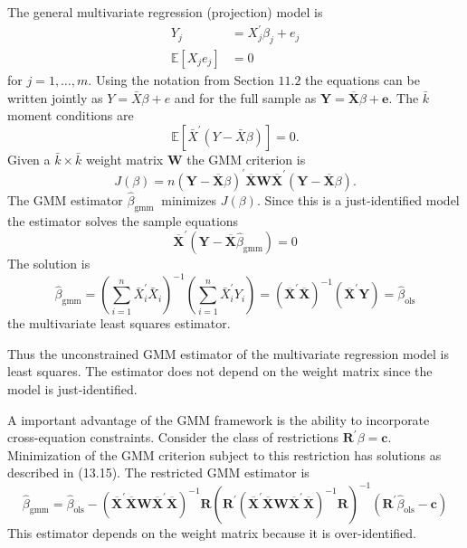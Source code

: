 \documentclass[10pt]{article}
\begin{document}
The general multivariate regression (projection) model is
$$
\begin{aligned}
Y_{j} &=X_{j}^{\prime} \beta_{j}+e_{j} \\
\mathbb{E}\left[X_{j} e_{j}\right] &=0
\end{aligned}
$$
for $j=1, \ldots, m$. Using the notation from Section $11.2$ the equations can be written jointly as $Y=\bar{X} \beta+e$ and for the full sample as $\boldsymbol{Y}=\overline{\boldsymbol{X}} \beta+\boldsymbol{e}$. The $\bar{k}$ moment conditions are
$$
\mathbb{E}\left[\bar{X}^{\prime}(Y-\bar{X} \beta)\right]=0 .
$$
Given a $\bar{k} \times \bar{k}$ weight matrix $\boldsymbol{W}$ the GMM criterion is
$$
J(\beta)=n(\boldsymbol{Y}-\overline{\boldsymbol{X}} \beta)^{\prime} \overline{\boldsymbol{X}} \boldsymbol{W} \overline{\boldsymbol{X}}^{\prime}(\boldsymbol{Y}-\overline{\boldsymbol{X}} \beta) .
$$
The GMM estimator $\widehat{\beta}_{\text {gmm }}$ minimizes $J(\beta)$. Since this is a just-identified model the estimator solves the sample equations
$$
\overline{\boldsymbol{X}}^{\prime}\left(\boldsymbol{Y}-\overline{\boldsymbol{X}} \widehat{\beta}_{\mathrm{gmm}}\right)=0
$$
The solution is
$$
\widehat{\beta}_{\mathrm{gmm}}=\left(\sum_{i=1}^{n} \bar{X}_{i}^{\prime} \bar{X}_{i}\right)^{-1}\left(\sum_{i=1}^{n} \bar{X}_{i}^{\prime} Y_{i}\right)=\left(\overline{\boldsymbol{X}}^{\prime} \overline{\boldsymbol{X}}\right)^{-1}\left(\overline{\boldsymbol{X}}^{\prime} \boldsymbol{Y}\right)=\widehat{\beta}_{\mathrm{ols}}
$$
the multivariate least squares estimator.

Thus the unconstrained GMM estimator of the multivariate regression model is least squares. The estimator does not depend on the weight matrix since the model is just-identified.

A important advantage of the GMM framework is the ability to incorporate cross-equation constraints. Consider the class of restrictions $\boldsymbol{R}^{\prime} \beta=\boldsymbol{c}$. Minimization of the GMM criterion subject to this restriction has solutions as described in (13.15). The restricted GMM estimator is
$$
\widehat{\beta}_{\mathrm{gmm}}=\widehat{\beta}_{\mathrm{ols}}-\left(\overline{\boldsymbol{X}}^{\prime} \overline{\boldsymbol{X}} \boldsymbol{W} \overline{\boldsymbol{X}}^{\prime} \overline{\boldsymbol{X}}\right)^{-1} \boldsymbol{R}\left(\boldsymbol{R}^{\prime}\left(\overline{\boldsymbol{X}}^{\prime} \overline{\boldsymbol{X}} \boldsymbol{W} \overline{\boldsymbol{X}}^{\prime} \overline{\boldsymbol{X}}\right)^{-1} \boldsymbol{R}\right)^{-1}\left(\boldsymbol{R}^{\prime} \widehat{\beta}_{\mathrm{ols}}-\boldsymbol{c}\right)
$$
This estimator depends on the weight matrix because it is over-identified.
\end{document}
